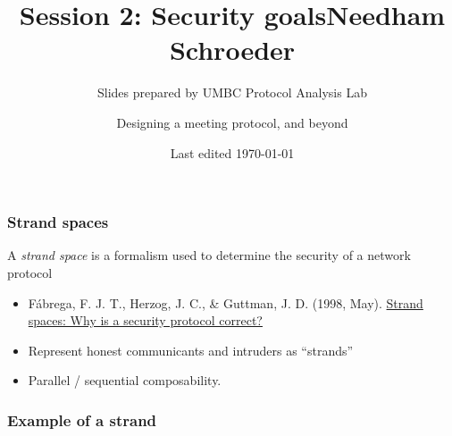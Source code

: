 \documentclass[red]{beamer}
\begin{document}

\title{Session 2: Security goals}
\author{Slides prepared by UMBC Protocol Analysis Lab}
\date{Last edited \today}
\begin{frame}
\maketitle
\end{frame}




\title{Needham Schroeder}
\author{Designing a meeting protocol, and beyond}
\date{}
\begin{frame}
\maketitle
\end{frame}

\begin{frame}\frametitle{Strand spaces}
A \emph{strand space} is a formalism used to determine the security of a network protocol
\begin{itemize}
\item Fábrega, F. J. T., Herzog, J. C., \& Guttman, J. D. (1998, May). \href{https://www.mitre.org/sites/default/files/pdf/guttman_strands.pdf}{Strand spaces: Why is a security protocol correct?}
\item Represent honest communicants and intruders as ``strands''
\item Parallel / sequential composability.
\end{itemize}
\end{frame}

\begin{frame}\frametitle{Example of a strand}
\end{frame}
\end{document}
